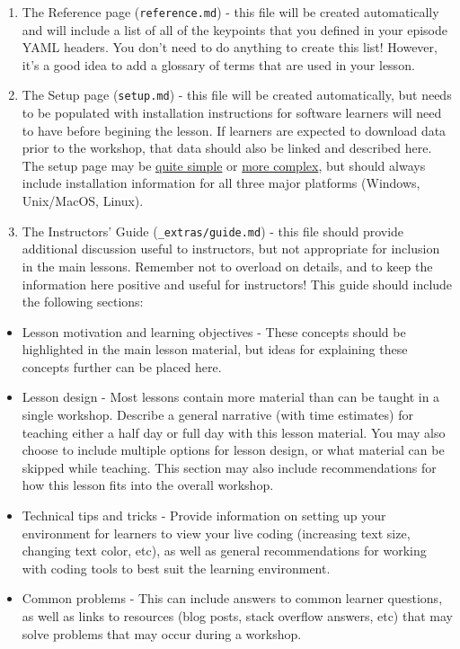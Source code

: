 \documentclass[]{book}
\begin{document}
\begin{enumerate}
\def\labelenumi{\arabic{enumi}.}
\item
  The Reference page (\texttt{reference.md}) - this file will be created automatically and will include a list
  of all of the keypoints that you defined in your episode YAML headers. You don't need to do anything to create
  this list! However, it's a good idea to add a glossary of terms that are used in your lesson.
\item
  The Setup page (\texttt{setup.md}) - this file will be created automatically, but needs to be populated with
  installation instructions for software learners will need to have before begining the lesson. If learners are
  expected to download data prior to the workshop, that data should also be linked and described here. The setup
  page may be \href{http://swcarpentry.github.io/git-novice/setup.html}{quite simple} or
  \href{https://datacarpentry.org/geospatial-workshop/setup.html}{more complex}, but should
  always include installation information for all three major platforms (Windows, Unix/MacOS, Linux).
\item
  The Instructors' Guide (\texttt{\_extras/guide.md}) - this file should provide additional discussion useful to
  instructors,
  but not appropriate for inclusion in the main lessons. Remember not to overload on details, and to keep the
  information here positive and useful for instructors! This guide should include the following sections:
\end{enumerate}

\begin{itemize}
\item
  Lesson motivation and learning objectives - These concepts should be highlighted in the main lesson material,
  but ideas for
  explaining these concepts further can be placed here.
\item
  Lesson design - Most lessons contain more material than can be taught in a single workshop.
  Describe a general narrative (with time estimates) for teaching either a half day
  or full day with this lesson material. You may also choose to include multiple
  options for lesson design, or what material can be skipped while teaching.
  This section may also include recommendations for how this lesson fits into
  the overall workshop.
\item
  Technical tips and tricks - Provide information on setting up your environment for learners to view your
  live coding (increasing text size, changing text color, etc), as well as
  general recommendations for working with coding tools to best suit the
  learning environment.
\item
  Common problems - This can include answers to common learner questions, as well as links to
  resources (blog posts, stack overflow answers, etc) that may solve problems that
  may occur during a workshop.
\end{itemize}
\end{document}

